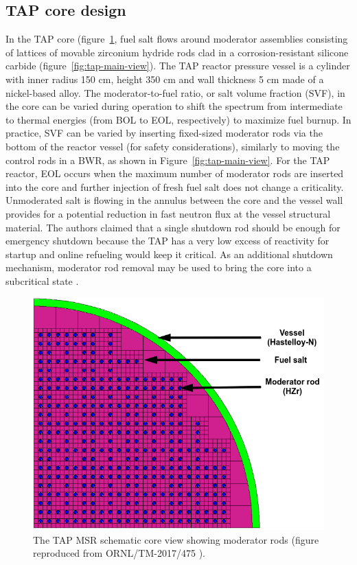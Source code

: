 \documentclass[12pt]{article} %
\begin{document}
\subsection{TAP core design}
In the \gls{TAP} core (figure~\ref{fig:tap-core-view}, fuel salt flows around 
moderator assemblies consisting 
of lattices of 
movable zirconium hydride rods clad in a corrosion-resistant silicone carbide 
(figure~\ref{fig:tap-main-view}). The \gls{TAP} reactor pressure vessel is a 
cylinder with inner radius 150 cm, height 350 cm and wall thickness 5 cm made 
of a nickel-based alloy. The moderator-to-fuel ratio, or salt volume fraction 
(SVF), in the core can be varied during operation to 
shift the spectrum from intermediate to thermal energies (from \gls{BOL} to 
\gls{EOL}, respectively) to maximize fuel burnup. In practice, SVF can be 
varied by inserting fixed-sized moderator rods via the bottom of the reactor 
vessel (for safety considerations), similarly to moving the control rods in 
a \gls{BWR}, as shown in Figure~\ref{fig:tap-main-view}. For the \gls{TAP} 
reactor, \gls{EOL} occurs when the maximum number of moderator rods are 
inserted into the core and further injection of fresh fuel salt does not 
change a criticality. Unmoderated salt is flowing in the annulus 
between the core and the vessel wall provides for a potential reduction in 
fast neutron flux at the vessel structural material. The authors claimed that a 
single shutdown rod should be enough for emergency shutdown because 
the \gls{TAP} has a very low excess of reactivity for startup and online 
refueling would keep it critical. As an additional shutdown mechanism, 
moderator rod removal may be used to bring the core into a subcritical state 
\cite{transatomic_power_corporation_neutronics_2016}.
\begin{figure}[htp!] %
		  \includegraphics[width=\textwidth]{tap_core_ornl.png}
  \caption{The \gls{TAP} \gls{MSR} schematic core view showing moderator rods 
  (figure reproduced from ORNL/TM-2017/475  
\cite{betzler_assessment_2017}).}
  \label{fig:tap-core-view}
\end{figure}
\end{document}
